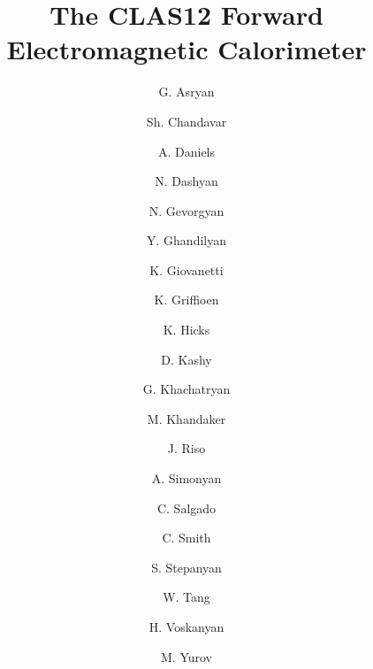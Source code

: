 \title{The CLAS12 Forward Electromagnetic Calorimeter}

\author[YerPi]{G. Asryan}
\author[Ohio]{Sh. Chandavar}
\author[Ohio]{A. Daniels}
\author[YerPi]{N. Dashyan}
\author[YerPi]{N. Gevorgyan}
\author[YerPi]{Y. Ghandilyan}
\author[JMU]{K. Giovanetti}
\author[WmM]{K. Griffioen}
\author[Ohio]{K. Hicks}
\author[JLAB] {D. Kashy}
\author[YerPi]{G. Khachatryan}
\author[NSU]{M. Khandaker}
\author[WmM]{J. Riso}
\author[YerPi]{A. Simonyan}
\author[NSU] {C. Salgado}
\author[UVA]{C. Smith}
\author[JLAB]{S. Stepanyan}
\author[Ohio]{W. Tang}
\author[YerPi]{H. Voskanyan}
\author[KPook] {M. Yurov}

\address[JLAB]{Thomas Jefferson National Accelerator Facility, 
Newport News, VA 23606, USA}
\address[WmM]{The College of William and Mary, Williamsburg, VA 23185, USA}
\address[Ohio]{Ohio University, Athens, OH 45701, USA} 
\address[NSU] {Norfolk State University, Norfolk, VA 23504, USA}
\address[UVA]{University of Virginia, Charlottesville, VA 22901, USA}
\address[YerPi]{A. Alikhanyan National Science Laboratory,  Yerevan, 375036, Armenia}
\address[JMU]{James Madison University, Harrisonburg, VA 22807 , USA}
\address[KPook]{Kyungpook National University, Daegu 41566, Republic of Korea}

